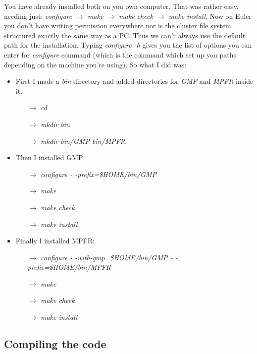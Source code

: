 \documentclass{article}
\begin{document}
You have already installed both on you own computer. That was rather easy, needing just: 
\emph{configure $\rightarrow$ make $\rightarrow$ make check $\rightarrow$ make install}. Now on Euler you don't have writing permission everywhere nor is the cluster file system structured exactly the same way as a PC. Thus we can't always use the default path for the installation. Typing \emph{configure -h} gives you the list of options you can enter for \emph{configure} command (which is the command which set up you paths depending on the machine you're using). So what I did was: 

\begin{itemize}
	\item First I made a \emph{bin} directory and added directories for \emph{GMP} and \emph{MPFR} inside it. 
	\begin{itemize}
		\item[$\rightarrow$] \emph{cd }
		\item[$\rightarrow$] \emph{mkdir bin }
		\item[$\rightarrow$] \emph{mkdir bin/GMP bin/MPFR }
	\end{itemize}
	
	\item Then I installed GMP:
	\begin{itemize}
		\item[$\rightarrow$] \emph{configure \quad - -prefix=\$HOME/bin/GMP}
		\item[$\rightarrow$] \emph{make}
		\item[$\rightarrow$] \emph{make check}
		\item[$\rightarrow$] \emph{make install}
	\end{itemize}
	
	\item Finally I installed MPFR:
	\begin{itemize}
		\item[$\rightarrow$] \emph{configure \quad - -with-gmp=\$HOME/bin/GMP \quad - -prefix=\$HOME/bin/MPFR}
		\item[$\rightarrow$] \emph{make}
		\item[$\rightarrow$] \emph{make check}
		\item[$\rightarrow$] \emph{make install}
	\end{itemize}
\end{itemize}


\subsection{Compiling the code}
\end{document}
